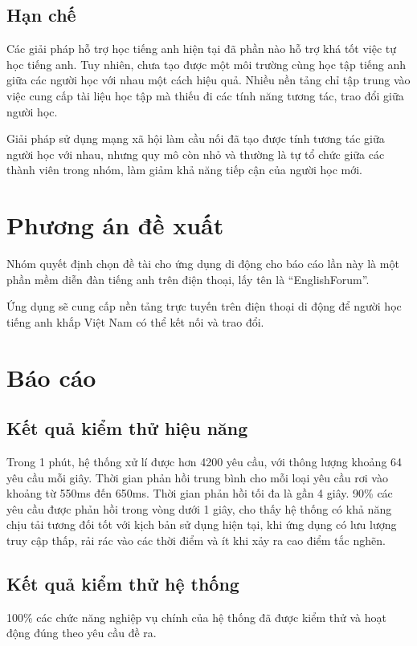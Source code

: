\documentclass{uetgraduation}
\begin{document}
\subsection{Hạn chế}
Các giải pháp hỗ trợ học tiếng anh hiện tại đã phần nào hỗ trợ khá tốt việc tự học
tiếng anh. Tuy nhiên, chưa tạo được một môi trường cùng học tập tiếng anh giữa
các người học với nhau một cách hiệu quả. Nhiều nền tảng chỉ tập trung vào việc
 cung cấp tài liệu học tập mà thiếu đi các tính năng tương tác, trao đổi giữa người học.\par
 Giải pháp sử dụng mạng xã hội làm cầu nối đã tạo được tính tương tác giữa người học với nhau,
 nhưng quy mô còn nhỏ và thường là tự tổ chức giữa các thành viên trong nhóm, làm giảm khả năng tiếp cận
 của người học mới.

\section{Phương án đề xuất}
Nhóm quyết định chọn đề tài cho ứng dụng di động cho báo cáo lần này là một phần mềm diễn đàn tiếng anh trên điện thoại, lấy tên là ``EnglishForum''.
\par
Ứng dụng sẽ cung cấp nền tảng trực tuyến trên điện thoại di động để người học tiếng anh khắp Việt Nam có thể kết nối và trao đổi.

\section{Báo cáo}
\subsection{Kết quả kiểm thử hiệu năng}
Trong 1 phút, hệ thống xử lí được hơn 4200 yêu cầu, với thông lượng khoảng 64
yêu cầu mỗi giây. Thời gian phản hồi trung bình cho mỗi loại yêu cầu rơi vào khoảng từ
550ms đến 650ms. Thời gian phản hồi tối đa là gần 4 giây. 90\% các yêu cầu được phản
hồi trong vòng dưới 1 giây, cho thấy hệ thống có khả năng chịu tải tương đối tốt với kịch
bản sử dụng hiện tại, khi ứng dụng có lưu lượng truy cập thấp, rải rác vào
các thời điểm và ít khi xảy ra cao điểm tắc nghẽn.

\subsection{Kết quả kiểm thử hệ thống}
100\% các chức năng nghiệp vụ chính của hệ thống đã được kiểm thử và hoạt động đúng theo yêu cầu đề ra.
\end{document}
